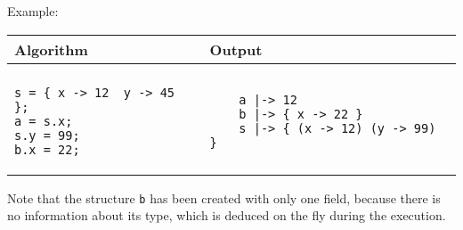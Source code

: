 \documentclass[a4paper]{report}
\begin{document}
Example:
\begin{center}
\begin{tabular}{ll}
Algorithm & Output\\
\hline
\\
\begin{minipage}{.45\textwidth}
\begin{verbatim}
s = { x -> 12  y -> 45 };
a = s.x;
s.y = 99;
b.x = 22;
\end{verbatim}
\end{minipage}
&
\begin{minipage}{.45\textwidth}
\begin{verbatim}
    a |-> 12
    b |-> { x -> 22 }
    s |-> { (x -> 12) (y -> 99) }
\end{verbatim}
\end{minipage}
\end{tabular}
\end{center}
Note that the structure \texttt{b} has been created with only one field, because there is no information about its type, which is deduced on the fly during the execution.
\end{document}
